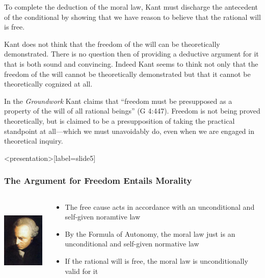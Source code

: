 To complete the deduction of the moral law, Kant must discharge the antecedent of the conditional by showing that we have reason to believe that the rational will is free.

Kant does not think that the freedom of the will can be theoretically demonstrated. There is no question then of providing a deductive argument for it that is both sound and convincing. Indeed Kant seems to think not only that the freedom of the will cannot be theoretically demonstrated but that it cannot be theoretically cognized at all. 


In the \emph{Groundwork} Kant claims that ``freedom must be presupposed as a property of the will of all rational beings'' (G 4:447). Freedom is not being proved theoretically, but is claimed to be a presupposition of taking the practical standpoint at all---which we must unavoidably do, even when we are engaged in theoretical inquiry. \change

\begin{frame}<presentation>[label=slide5]
    \frametitle{The Argument for Freedom Entails Morality}
        \begin{columns}
            \begin{column}{3cm}
                \includegraphics[height=4cm]{../../graphics/kant.jpg}
            \end{column}
            \begin{column}{7cm}
                \begin{itemize}
                    \item The free cause acts in accordance with an unconditional and self-given noramtive law
                    \item By the \alert{Formula of Autonomy}, the moral law just is an unconditional and self-given normative law
                    \item If the rational will is free, the moral law is unconditionally valid for it
                \end{itemize}
            \end{column}
        \end{columns}
\end{frame}

